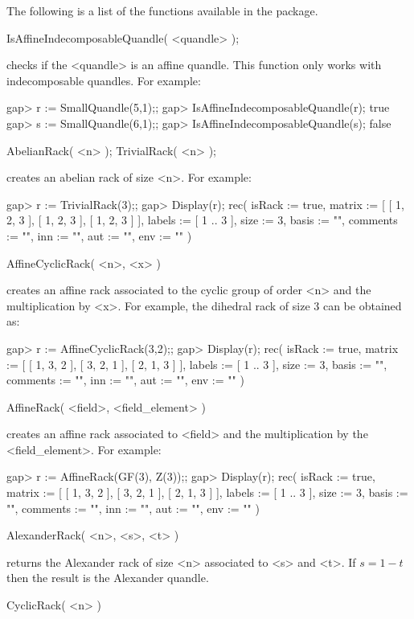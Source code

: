 
The following is a list of the functions available in the {\RiG} package. 

\>IsAffineIndecomposableQuandle( <quandle> );

checks if the <quandle> is an affine quandle. This function only works 
with indecomposable quandles. For example:

\beginexample
gap> r := SmallQuandle(5,1);;
gap> IsAffineIndecomposableQuandle(r);
true
gap> s := SmallQuandle(6,1);;
gap> IsAffineIndecomposableQuandle(s);
false
\endexample

\>AbelianRack( <n> );
\>TrivialRack( <n> );

creates an abelian rack of size <n>. For example:

\beginexample
gap> r := TrivialRack(3);;
gap> Display(r);
rec(
  isRack := true,
  matrix := [ [ 1, 2, 3 ], [ 1, 2, 3 ], [ 1, 2, 3 ] ],
  labels := [ 1 .. 3 ],
  size := 3,
  basis := "",
  comments := "",
  inn := "",
  aut := "",
  env := "" )
\endexample

\>AffineCyclicRack( <n>, <x> )

creates an affine rack associated to the cyclic group of order <n> and
the multiplication by <x>. For example, the dihedral rack of size 3
can be obtained as:

\beginexample
gap> r := AffineCyclicRack(3,2);;
gap> Display(r);
rec(
  isRack := true,
  matrix := [ [ 1, 3, 2 ], [ 3, 2, 1 ], [ 2, 1, 3 ] ],
  labels := [ 1 .. 3 ],
  size := 3,
  basis := "",
  comments := "",
  inn := "",
  aut := "",
  env := "" )
\endexample

\>AffineRack( <field>, <field_element> )

creates an affine rack associated to <field> and the multiplication
by the <field_element>. For example:

\beginexample
gap> r := AffineRack(GF(3), Z(3));;
gap> Display(r);
rec(
  isRack := true,
  matrix := [ [ 1, 3, 2 ], [ 3, 2, 1 ], [ 2, 1, 3 ] ],
  labels := [ 1 .. 3 ],
  size := 3,
  basis := "",
  comments := "",
  inn := "",
  aut := "",
  env := "" )
\endexample

\>AlexanderRack( <n>, <s>, <t> )

returns the Alexander rack of size <n> associated to <s> and <t>.
If $s=1-t$ then the result is the Alexander quandle.

\>CyclicRack( <n> )


